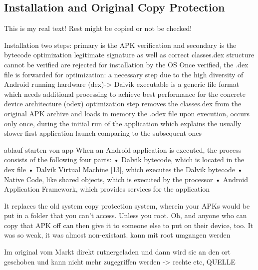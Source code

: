 \subsection{Installation and Original Copy Protection} \label{subsection:android-copy}
This is my real text! Rest might be copied or not be checked!

%
Installation two steps:  primary is the APK verification and secondary is the bytecode optimization\newline
legitimate signature as well as correct classes.dex structure cannot be verified are rejected for installation by the OS\newline
Once verified, the .dex file is forwarded for optimization: a necessary step due to the high diversity of Android running hardware (dex)-> Dalvik executable is a generic file format which needs additional processing to achieve best performance for the concrete device architecture (odex)\newline
optimization\newline
step removes the classes.dex from the original APK archive and loads in memory the .odex file upon execution, occurs only once, during the initial run of the application which explains the usually slower first application launch comparing to the subsequent ones

ablauf starten von app\newline
When an Android application is executed, the process consists of the following four parts:
• Dalvik bytecode, which is located in the dex file
• Dalvik Virtual Machine [13], which executes the Dalvik bytecode
• Native Code, like shared objects, which is executed by the processor
• Android Application Framework, which provides services for the application\newline
\cite{kovachevaMaster}
%


 It replaces the old system copy protection system, wherein your APKs would be put in a folder that you can't access. Unless you root. Oh, and anyone who can copy that APK off can then give it to someone else to put on their device, too. It was so weak, it was almost non-existant.\newline
 kann mit root umgangen werden


Im original vom Markt direkt rutnergeladen und dann wird sie an den ort geschoben und kann nicht mehr zugegriffen werden -> rechte etc, QUELLE\newline
